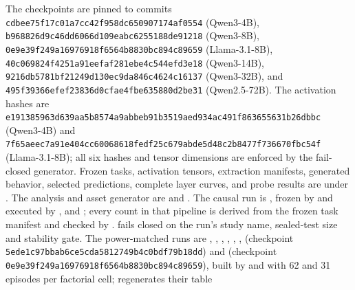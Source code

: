 The checkpoints are pinned to commits
\texttt{cdbee75f17c01a7cc42f958dc650907174af0554} (Qwen3-4B),
\texttt{b968826d9c46dd6066d109eabc6255188de91218} (Qwen3-8B),
\texttt{0e9e39f249a16976918f6564b8830bc894c89659} (Llama-3.1-8B),
\texttt{40c069824f4251a91eefaf281ebe4c544efd3e18} (Qwen3-14B),
\texttt{9216db5781bf21249d130ec9da846c4624c16137} (Qwen3-32B), and
\texttt{495f39366efef23836d0cfae4fbe635880d2be31} (Qwen2.5-72B).
The activation hashes are
\texttt{e1913859\allowbreak{}63d639aa\allowbreak{}5b8574a9\allowbreak{}abbeb91b\allowbreak{}3519aed9\allowbreak{}34ac491f\allowbreak{}86365563\allowbreak{}1b26dbbc}
(Qwen3-4B) and
\texttt{7f65aeec\allowbreak{}7a91e404\allowbreak{}cc600686\allowbreak{}18fedf25\allowbreak{}c679abde\allowbreak{}5d48c2b8\allowbreak{}477f7366\allowbreak{}70fbc54f}
(Llama-3.1-8B); all six hashes and tensor dimensions are enforced by the
fail-closed generator. Frozen tasks, activation tensors, extraction manifests,
generated behavior, selected predictions, complete layer curves, and probe
results are under
.
The analysis and asset generator are
 and
. The causal run is
, frozen by
 and executed by
, 
and ; every count in that pipeline is
derived from the frozen task manifest and checked by
.
 fails closed on the run's
study name, sealed-test size and stability gate. The power-matched runs are
,
,
,
,
,
,
 (checkpoint
\texttt{5ede1c97bbab6ce5cda5812749b4c0bdf79b18dd}) and
 (checkpoint
\texttt{0e9e39f249a16976918f6564b8830bc894c89659}), built by
 and
 with 62 and 31 episodes per factorial
cell;  regenerates their table
